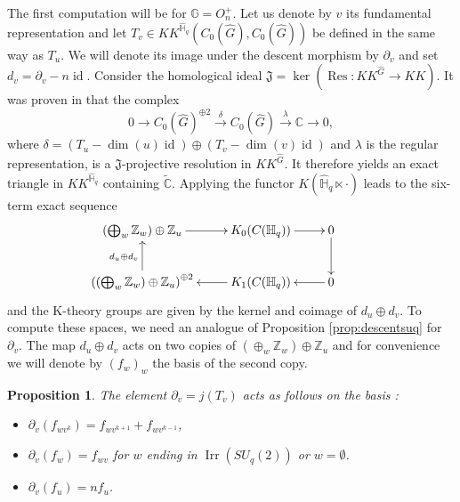\documentclass[a4paper, 11pt]{amsart}
\theoremstyle{plain}
\newtheorem{prop}[thm]{Proposition}
\theoremstyle{definition}
\theoremstyle{remark}
\DeclareMathOperator{\id}{id}
\DeclareMathOperator{\Irr}{Irr}
\DeclareMathOperator{\Res}{Res}
\newcommand{\C}{\mathbb{C}}
\newcommand{\G}{\mathbb{G}}
\newcommand{\HH}{\mathbb{H}}
\newcommand{\Z}{\mathbb{Z}}
\begin{document}
The first computation will be for $\G = O_{n}^{+}$. Let us denote by $v$ its fundamental representation and let $T_{v}\in KK^{\widehat{\HH}_{q}}(C_{0}(\widehat{G}), C_{0}(\widehat{G}))$ be defined in the same way as $T_{u}$. We will denote its image under the descent morphism by $\partial_{v}$ and set $d_{v} = \partial_{v} - n\id$. Consider the homological ideal $\mathfrak{J} = \ker(\Res : KK^{\widehat{G}}\to KK)$. It was proven in \cite{vergnioux2013k} that the complex
\begin{equation}
0 \longrightarrow C_{0}(\widehat{G})^{\oplus 2} \overset{\delta}{\longrightarrow} C_{0}(\widehat{G}) \overset{\lambda}{\longrightarrow} \C \longrightarrow 0,
\end{equation}
where $\delta = (T_{u} - \dim(u)\id)\oplus (T_{v} - \dim(v)\id)$ and $\lambda$ is the regular representation, is a $\mathfrak{J}$-projective resolution in $KK^{\widehat{G}}$. It therefore yields an exact triangle in $KK^{\widehat{\HH}_{q}}$ containing $\widetilde{\C}$. Applying the functor $K(\widehat{\HH}_{q}\ltimes\cdot)$ leads to the six-term exact sequence
\begin{equation*}
\xymatrix{ \left(\bigoplus_{w}\Z_{w}\right)\oplus\Z_{u} \ar[r] & K_{0}(C(\HH_{q})) \ar[r] & 0 \ar[d] & \\
 \left(\left(\bigoplus_{w}\Z_{w}\right)\oplus\Z_{u}\right)^{\oplus 2} \ar[u]^{d_{u}\oplus d_{v}}& K_{1}(C(\HH_{q})) \ar[l]& 0 \ar[l] }
\end{equation*}
and the K-theory groups are given by the kernel and coimage of $d_{u}\oplus d_{v}$. To compute these spaces, we need an analogue of Proposition \ref{prop:descentsuq} for $\partial_{v}$. The map $d_{u}\oplus d_{v}$ acts on two copies of $(\oplus_{w}\Z_{w})\oplus\Z_{u}$ and for convenience we will denote by $(f_{w})_{w}$ the basis of the second copy.

\begin{prop}\label{prop:descentorthogonal}
The element $\partial_{v} = j(T_{v})$ acts as follows on the basis :
\begin{itemize}
\item $\partial_{v}(f_{wv^{k}}) = f_{wv^{k+1}} + f_{wv^{k-1}}$,
\item $\partial_{v}(f_{w}) = f_{wv}$ for $w$ ending in $\Irr(SU_{q}(2))$ or $w = \emptyset$.
\item $\partial_{v}(f_{u}) = nf_{u}$.
\end{itemize}
\end{prop}
\end{document}
